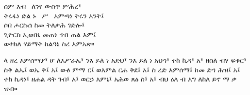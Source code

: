 \documentclass[12pt]{book}
\begin{document}
%

\frontmatter

\mainmatter

\clearpage
{}



\begin{CJK*}{JIS}{song}

ሰም እብ \ ለንየ ውስጥ ምሕረ፤ \\
ትሩፋነ ድል ኑ \ ሥ \ አምጣነ ትሩን አንት፤ \\
ሶበ ሖርኩሰ ከመ ትለቃሕ ገድሎ፤ \\
ጊዮርስ ኢወበኒ መጠነ ጥበ ጠል እም፤\\
ወተክለ ሃይማት ከልዓኒ ስረ እምአጽ። 

ላ ዘረ እምሰማያ፤ 
ሆ ለእሥራኤ፤ ንእ 
ይለ ነ አድህ፤ 
ንእ ይለ ነ አህኅ፤
ተከ ኪዳ፤ አ፤ ዘስለ ብሃ
ፍቁር፤ ስቅ ልኤ፤ ወኤ 
ቅ፤ አ፤ ውፅ ምማ 
ር፤ ወእምል ርሐ ቅደ፤ አ፤
ስ ረድ እምሰማ፤ ከመ ድኅ
ሕዝ፤ አ፤ ተከ ኪዳነ፤ ዘሐል 
ዳት ገብ፤ አ፤ ወርኃ እምኔ፤
አሕወ ጸዕ ስ፤ አ፤ ብህ 
 ዕለ ብ እግ
ለከለ ይኖ ማ ቃ 
ዝብ።

\end{CJK*}

\printindex
\end{document}
